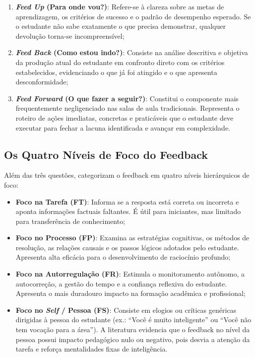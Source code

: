 \begin{enumerate}
  \item \textbf{\emph{Feed Up} (Para onde vou?)}: Refere-se {\`a} clareza sobre as metas de aprendizagem, os crit{\'e}rios de sucesso e o padr{\~a}o de desempenho esperado. Se o estudante n{\~a}o sabe exatamente o que precisa demonstrar, qualquer devolu{\c c}{\~a}o torna-se incompreens{\'i}vel;
  \item \textbf{\emph{Feed Back} (Como estou indo?)}: Consiste na an{\'a}lise descritiva e objetiva da produ{\c c}{\~a}o atual do estudante em confronto direto com os crit{\'e}rios estabelecidos, evidenciando o que j{\'a} foi atingido e o que apresenta desconformidade;
  \item \textbf{\emph{Feed Forward} (O que fazer a seguir?)}: Constitui o componente mais frequentemente negligenciado nas salas de aula tradicionais. Representa o roteiro de a{\c c}{\~o}es imediatas, concretas e pratic{\'a}veis que o estudante deve executar para fechar a lacuna identificada e avan{\c c}ar em complexidade.
\end{enumerate}

\subsection{Os Quatro N{\'i}veis de Foco do Feedback}

Al{\'e}m das tr{\^e}s quest{\~o}es,  categorizam o feedback em quatro n{\'i}veis hier{\'a}rquicos de foco:

\begin{itemize}
  \item \textbf{Foco na Tarefa (FT)}: Informa se a resposta est{\'a} correta ou incorreta e aponta informa{\c c}{\~o}es factuais faltantes. {\'E} {\'u}til para iniciantes, mas limitado para transfer{\^e}ncia de conhecimento;
  \item \textbf{Foco no Processo (FP)}: Examina as estrat{\'e}gias cognitivas, os m{\'e}todos de resolu{\c c}{\~a}o, as rela{\c c}{\~o}es causais e os passos l{\'o}gicos adotados pelo estudante. Apresenta alta efic{\'a}cia para o desenvolvimento de racioc{\'i}nio profundo;
  \item \textbf{Foco na Autorregula{\c c}{\~a}o (FR)}: Estimula o monitoramento aut{\^o}nomo, a autocorre{\c c}{\~a}o, a gest{\~a}o do tempo e a confian{\c c}a reflexiva do estudante. Apresenta o mais duradouro impacto na forma{\c c}{\~a}o acad{\^e}mica e profissional;
  \item \textbf{Foco no \emph{Self} / Pessoa (FS)}: Consiste em elogios ou cr{\'i}ticas gen{\'e}ricas dirigidas {\`a} pessoa do estudante (ex.: ``Voc{\^e} {\'e} muito inteligente'' ou ``Voc{\^e} n{\~a}o tem voca{\c c}{\~a}o para a {\'a}rea''). A literatura evidencia que o feedback no n{\'i}vel da pessoa possui impacto pedag{\'o}gico nulo ou negativo, pois desvia a aten{\c c}{\~a}o da tarefa e refor{\c c}a mentalidades fixas de intelig{\^e}ncia.
\end{itemize}


